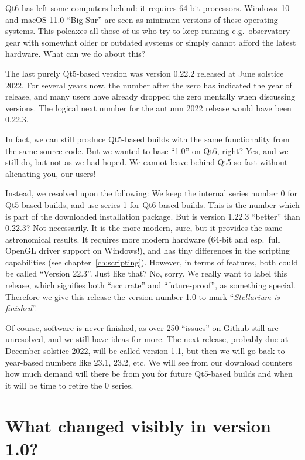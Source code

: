 Qt6 has left some computers behind: it requires 64-bit processors.
Windows~10 and macOS 11.0 ``Big Sur'' are seen as minimum versions of
these operating systems. This poleaxes all those of us who try to keep
running e.g.\ observatory gear with somewhat older or outdated systems
or simply cannot afford the latest hardware.  What can we do about
this?

The last purely Qt5-based version was version 0.22.2 released at June
solstice 2022. For several years now, the number after the zero has
indicated the year of release, and many users have already dropped the
zero mentally when discussing versions.  The logical next number for
the autumn 2022 release would have been 0.22.3.

In fact, we can still produce Qt5-based builds with the same
functionality from the same source code. But we wanted to base ``1.0''
on Qt6, right? Yes, and we still do, but not as we had hoped. We
cannot leave behind Qt5 so fast without alienating you, our users!

Instead, we resolved upon the following: We keep the internal series
number 0 for Qt5-based builds, and use series 1 for Qt6-based
builds. This is the number which is part of the downloaded
installation package.  But is version 1.22.3 ``better'' than 0.22.3?
Not necessarily. It is the more modern, sure, but it provides the same
astronomical results. It requires more modern hardware (64-bit and
esp.\ full OpenGL driver support on Windows!), and has tiny
differences in the scripting capabilities (see
chapter~\ref{ch:scripting}). However, in terms of features, both could
be called ``Version 22.3''. Just like that? No, sorry.
We really want to label this release, which signifies both ``accurate'' and
``future-proof'', as something special. Therefore we give this release
the version number 1.0 to mark ``\emph{Stellarium is finished}''.

Of course, software is never finished, as over 250 ``issues'' on
Github still are unresolved, and we still have ideas for more. The
next release, probably due at December solstice 2022, will be called
version 1.1, but then we will go back to year-based numbers like 23.1,
23.2, etc. We will see from our download counters how much demand will
there be from you for future Qt5-based builds and when it will be time to retire
the 0 series.


\section*{What changed visibly in version 1.0?}

